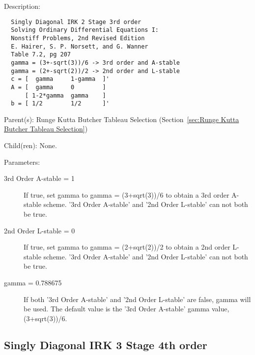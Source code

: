 \begin{list}{}
  {\setlength{\leftmargin}{1.0in}
   \setlength{\labelwidth}{0.75in}
   \setlength{\labelsep}{0.125in}}
  \item[Description:]
\begin{verbatim}
  Singly Diagonal IRK 2 Stage 3rd order
  Solving Ordinary Differential Equations I:
  Nonstiff Problems, 2nd Revised Edition
  E. Hairer, S. P. Norsett, and G. Wanner
  Table 7.2, pg 207
  gamma = (3+-sqrt(3))/6 -> 3rd order and A-stable
  gamma = (2+-sqrt(2))/2 -> 2nd order and L-stable
  c = [  gamma     1-gamma  ]'
  A = [  gamma     0        ]
      [ 1-2*gamma  gamma    ]
  b = [ 1/2        1/2      ]'
\end{verbatim}
  \item[Parent(s):]
    Runge Kutta Butcher Tableau Selection (Section~\ref{sec:Runge Kutta Butcher Tableau Selection})
  \item[Child(ren):]
    None. 
  \item[Parameters:]
    \begin{description}
      \item[3rd Order A-stable = 1] 
If true, set gamma to gamma = (3+sqrt(3))/6 to obtain a 3rd order A-stable scheme. '3rd Order A-stable' and '2nd Order L-stable' can not both be true.
      \item[2nd Order L-stable = 0] 
If true, set gamma to gamma = (2+sqrt(2))/2 to obtain a 2nd order L-stable scheme. '3rd Order A-stable' and '2nd Order L-stable' can not both be true.
      \item[gamma = 0.788675] 
If both '3rd Order A-stable' and '2nd Order L-stable' are false, gamma will be used. The default value is the '3rd Order A-stable' gamma value, (3+sqrt(3))/6.
\end{description}

\end{list}

\subsection{Singly Diagonal IRK 3 Stage 4th order}
\label{sec:Singly Diagonal IRK 3 Stage 4th order}

